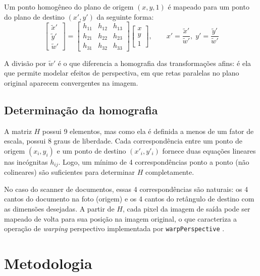 \documentclass[conference]{IEEEtran}
\begin{document}
Um ponto homogêneo do plano de origem $(x, y, 1)$ é mapeado para um ponto do plano de destino $(x', y')$ da seguinte forma:
\begin{equation}
\begin{bmatrix}
\tilde{x}' \\
\tilde{y}' \\
\tilde{w}'
\end{bmatrix}
=
\begin{bmatrix}
h_{11} & h_{12} & h_{13} \\
h_{21} & h_{22} & h_{23} \\
h_{31} & h_{32} & h_{33}
\end{bmatrix}
\begin{bmatrix}
x \\
y \\
1
\end{bmatrix},
\qquad
x' = \frac{\tilde{x}'}{\tilde{w}'}, \;
y' = \frac{\tilde{y}'}{\tilde{w}'}
\label{eq:homografia}
\end{equation}

A divisão por $\tilde{w}'$ é o que diferencia a homografia das transformações afins: é ela que permite modelar efeitos de perspectiva, em que retas paralelas no plano original aparecem convergentes na imagem.

\subsection{Determinação da homografia}

A matriz $H$ possui 9 elementos, mas como ela é definida a menos de um fator de escala, possui 8 graus de liberdade. Cada correspondência entre um ponto de origem $(x_i, y_i)$ e um ponto de destino $(x'_i, y'_i)$ fornece duas equações lineares nas incógnitas $h_{ij}$. Logo, um mínimo de 4 correspondências ponto a ponto (não colineares) são suficientes para determinar $H$ completamente.

No caso do scanner de documentos, essas 4 correspondências são naturais: os 4 cantos do documento na foto (origem) e os 4 cantos do retângulo de destino com as dimensões desejadas. A partir de $H$, cada pixel da imagem de saída pode ser mapeado de volta para sua posição na imagem original, o que caracteriza a operação de \emph{warping} perspectivo implementada por \texttt{warpPerspective} \cite{bradski2000}.

\section{Metodologia}
\end{document}
